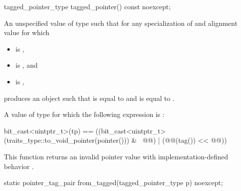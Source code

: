 \documentclass{wg21}
\begin{document}
%
\begin{itemdecl}
tagged_pointer_type tagged_pointer() const noexcept;
\end{itemdecl}

\begin{itemdescr}
\begin{removedblock}
\pnum
\returns
An unspecified value  of  type
such that for any specialization  of  and
alignment value  for which
\begin{itemize}
\item {} is ,
\item {} is , and
\item {} is ,
\end{itemize}
 produces an object  such that
 is equal to  and
 is equal to .
\end{removedblock}

\begin{addedblock}
\pnum
\returns
A value  of type  for which
the following expression is :
\begin{codeblock}
bit_cast<uintptr_t>(tp) ==
  ((bit_cast<uintptr_t>(traits_type::to_void_pointer(pointer())) & ~@@) |
   (@@(tag()) << @@))
\end{codeblock}
\end{addedblock}

\pnum
\begin{note}
This function returns an invalid pointer value 
with implementation-defined behavior .
\end{note}
\end{itemdescr}

%
\begin{itemdecl}
static pointer_tag_pair from_tagged(tagged_pointer_type p) noexcept;
\end{itemdecl}
\end{document}
